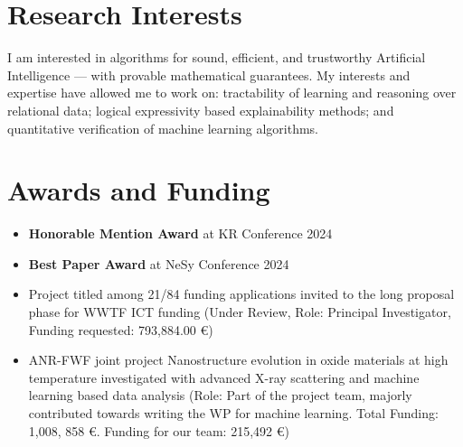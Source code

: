 \documentclass[10pt, a4paper]{article}
\newcommand{\years}[1]{\marginnote{\scriptsize #1}}
\begin{document}
\section*{Research Interests}
I am interested in algorithms for sound, efficient, and trustworthy Artificial Intelligence --- with provable mathematical guarantees. 
My interests and expertise have allowed me to work on: tractability of learning and reasoning over relational data; logical expressivity based explainability methods; and quantitative verification of machine learning algorithms. 

\section*{Awards and Funding}
\begin{itemize}
    \item \textbf{Honorable Mention Award} at KR Conference 2024
    \item \textbf{Best Paper Award} at NeSy Conference 2024 
    \item Project titled  among 21/84 funding applications invited to the long proposal phase for WWTF ICT funding (Under Review, Role: Principal Investigator, Funding requested: 793,884.00 €)
    \item ANR-FWF joint project Nanostructure evolution in oxide materials at high temperature investigated with advanced X-ray scattering and machine learning based data analysis (Role: Part of the project team, majorly contributed towards writing the WP for machine learning. Total Funding: 1,008, 858 €. Funding for our team: 215,492 €)
\end{itemize}






\end{document}
